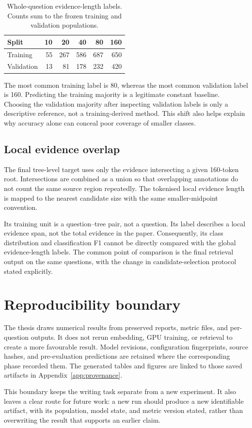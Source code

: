 \begin{table}[tbp]
\centering
\caption{Whole-question evidence-length labels. Counts sum to the
frozen training and validation populations.}
\label{tab:labels}
\begin{tabular}{@{}lrrrrr@{}}
\toprule
Split & 10 & 20 & 40 & 80 & 160\\
\midrule
Training & 55 & 267 & 586 & 687 & 650\\
Validation & 13 & 81 & 178 & 232 & 420\\
\bottomrule
\end{tabular}
\end{table}

The most common training label is 80, whereas the most common validation
label is 160. Predicting the training majority is a legitimate constant
baseline. Choosing the validation majority after inspecting validation
labels is only a descriptive reference, not a training-derived method.
This shift also helps explain why accuracy alone can conceal poor
coverage of smaller classes.

\subsection{Local evidence overlap}
The final tree-level target uses only the evidence intersecting a given
160-token root. Intersections are combined as a union so that overlapping
annotations do not count the same source region repeatedly. The
tokenised local evidence length is mapped to the nearest candidate
size with the same smaller-midpoint convention.

Its training unit is a question--tree pair, not a question. Its label
describes a local evidence span, not the total evidence in the paper.
Consequently, its class distribution and classification F1 cannot be
directly compared with the global evidence-length labels. The common
point of comparison is the final retrieval output on the same questions,
with the change in candidate-selection protocol stated explicitly.

\section{Reproducibility boundary}
The thesis draws numerical results from preserved reports, metric files,
and per-question outputs. It does not rerun embedding, GPU training,
or retrieval to create a more favourable result. Model revisions,
configuration fingerprints, source hashes, and pre-evaluation predictions
are retained where the corresponding phase recorded them. The generated
tables and figures are linked to those saved artifacts in
Appendix~\ref{app:provenance}.

This boundary keeps the writing task separate from a new experiment.
It also leaves a clear route for future work: a new run should produce
a new identifiable artifact, with its population, model state, and
metric version stated, rather than overwriting the result that supports
an earlier claim.
